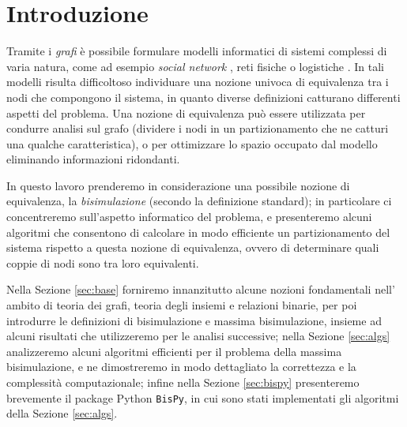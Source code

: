 \section{Introduzione}
Tramite i \emph{grafi} è possibile formulare modelli informatici di sistemi complessi di varia natura, come ad esempio \emph{social network} \cite{twitter}, reti fisiche \cite{electric} o logistiche \cite{supply}. In tali modelli risulta difficoltoso individuare una nozione univoca di equivalenza tra i nodi che compongono il sistema, in quanto diverse definizioni catturano differenti aspetti del problema. Una nozione di equivalenza può essere utilizzata per condurre analisi sul grafo (dividere i nodi in un partizionamento che ne catturi una qualche caratteristica), o per ottimizzare lo spazio occupato dal modello eliminando informazioni ridondanti.

In questo lavoro prenderemo in considerazione una possibile nozione di equivalenza, la \emph{bisimulazione} (secondo la definizione standard); in particolare ci concentreremo sull'aspetto informatico del problema, e presenteremo alcuni algoritmi che consentono di calcolare in modo efficiente un partizionamento del sistema rispetto a questa nozione di equivalenza, ovvero di determinare quali coppie di nodi sono tra loro equivalenti.

Nella Sezione \ref{sec:base} forniremo innanzitutto alcune nozioni fondamentali nell' ambito di teoria dei grafi, teoria degli insiemi e relazioni binarie, per poi introdurre le definizioni di bisimulazione e massima bisimulazione, insieme ad alcuni risultati che utilizzeremo per le analisi successive; nella Sezione \ref{sec:algs} analizzeremo alcuni algoritmi efficienti per il problema della massima bisimulazione, e ne dimostreremo in modo dettagliato la correttezza e la complessità computazionale; infine nella Sezione \ref{sec:bispy} presenteremo brevemente il package Python \texttt{BisPy}, in cui sono stati implementati gli algoritmi della Sezione \ref{sec:algs}.
